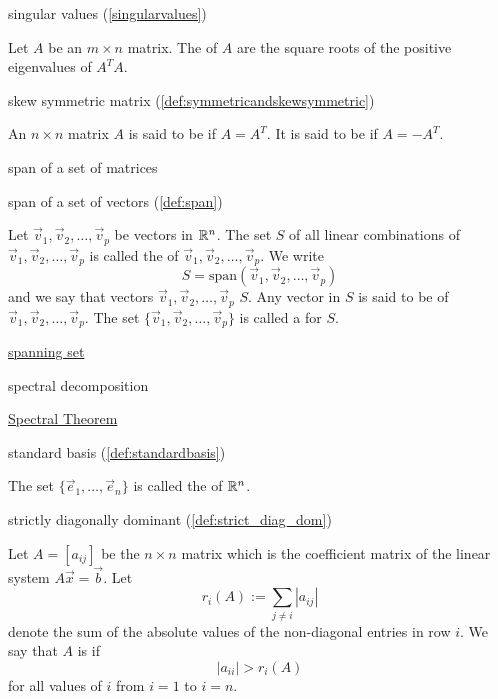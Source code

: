 \documentclass{ximera}
\begin{document}
singular values (\ref{singularvalues})
\begin{expandable}
    Let $A$ be an $m\times n$ matrix. The  of $A$ are the square roots of the positive
eigenvalues of $A^TA.$ 
\end{expandable}

skew symmetric matrix (\ref{def:symmetricandskewsymmetric})
\begin{expandable}
    An $n\times n$ matrix $A$ is said to be
 if $A=A^{T}.$ It is said to be
 if $A=-A^{T}.$
\end{expandable}

span of a set of matrices

span of a set of vectors (\ref{def:span})
\begin{expandable}
    Let $\vec{v}_1, \vec{v}_2,\ldots ,\vec{v}_p$ be vectors in $\mathbb{R}^n$.  The set $S$ of all linear combinations of $\vec{v}_1, \vec{v}_2,\ldots ,\vec{v}_p$ is called the  of $\vec{v}_1, \vec{v}_2,\ldots ,\vec{v}_p$.  We write 
$$S=\mbox{span}(\vec{v}_1, \vec{v}_2,\ldots ,\vec{v}_p)$$
and we say that vectors $\vec{v}_1, \vec{v}_2,\ldots ,\vec{v}_p$  $S$.  Any vector in $S$ is said to be  of $\vec{v}_1, \vec{v}_2,\ldots ,\vec{v}_p$.  The set $\{\vec{v}_1, \vec{v}_2,\ldots ,\vec{v}_p\}$ is called a  for $S$.
\end{expandable}

\href{https://ximera.osu.edu/oerlinalg/LinearAlgebra/VEC-0090/main}{spanning set}

spectral decomposition

\href{https://ximera.osu.edu/oerlinalg/LinearAlgebra/RTH-0035/main}{Spectral Theorem}

standard basis (\ref{def:standardbasis})
\begin{expandable}
    The set $\{\vec{e}_1, \ldots ,\vec{e}_n\}$ is called the  of $\mathbb{R}^n$.
\end{expandable}

strictly diagonally dominant (\ref{def:strict_diag_dom})
\begin{expandable}
    Let $A=[a_{ij}]$ be the $n\times n$ matrix which is the coefficient matrix of the linear system $A \vec{x}= \vec{b}$.  Let
$$
r_i(A):= \sum_{j \ne i} |a_{ij}|
$$
denote the sum of the absolute values of the non-diagonal entries in row $i$.  We say that $A$ is  if 
$$|a_{ii}|>r_i(A)$$
for all values of $i$ from $i=1$ to $i=n$.
\end{expandable}
\end{document}
